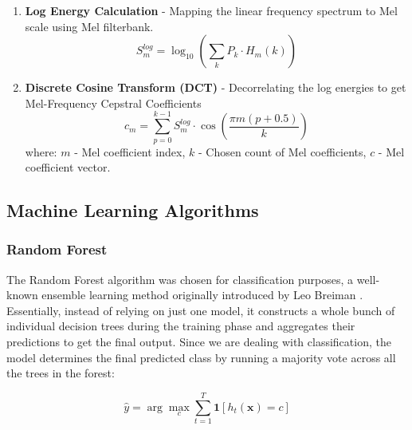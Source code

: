 \documentclass[
onecolumn,
]{ceurart}
\begin{document}
\begin{enumerate}[nosep]
		\begin{equation}
			H_m(k)=
			\begin{cases}
				0, & k < f_{m-1} \lor k > f_{m+1}\\
				\dfrac{k-f_{m-1}}{f_{m}-f_{m-1}}, & f_{m-1} \le k \le f_{m}\\
				\dfrac{f_{m+1}-k}{f_{m+1}-f_{m}}, & f_{m} \le k \le f_{m+1}
			\end{cases}
		\end{equation}
		where $m$ - filter number, $k$ - index of sample frequency, $f$ - vector of filters in Herzian scale, $H$ - Mel filterbank.
		\item \textbf{Log Energy Calculation} - Mapping the linear frequency spectrum to Mel scale using Mel filterbank.
		\begin{equation}
			S_m^{log}=\log_{10}\left (\sum\limits_k P_k\cdot H_m(k)\right )
		\end{equation}
		\item \textbf{Discrete Cosine Transform (DCT)} - Decorrelating the log energies to get Mel-Frequency Cepstral Coefficients
		\begin{equation}
			c_m=\sum\limits^{k-1}_{p=0}S_m^{log}\cdot \cos{\left (\dfrac{\pi m(p+0.5)}{k}\right )}
		\end{equation}
		where: $m$ - Mel coefficient index,  $k$ - Chosen count of Mel coefficients, $c $ - Mel coefficient vector.
	\end{enumerate}
	
	\subsection{Machine Learning Algorithms}
	\subsubsection{Random Forest}
	
	The Random Forest algorithm was chosen for classification purposes, a well-known ensemble learning method originally introduced by Leo Breiman \cite{breiman2001random}. Essentially, instead of relying on just one model, it constructs a whole bunch of individual decision trees during the training phase and aggregates their predictions to get the final output. Since we are dealing with classification, the model determines the final predicted class by running a majority vote across all the trees in the forest:
	
	\begin{equation}
		\hat{y} = \arg\max_{c} \sum_{t=1}^{T} \mathbf{1}\left[h_t(\mathbf{x}) = c\right]
	\end{equation}
	
\end{document}
